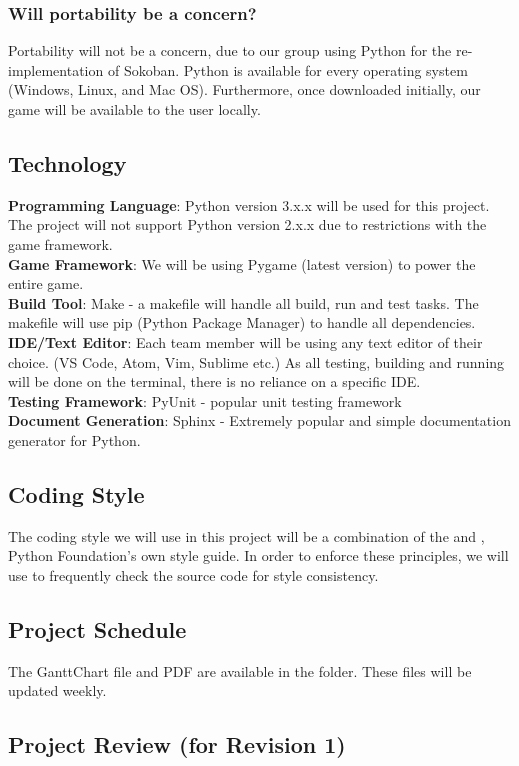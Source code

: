 \documentclass{article}
\begin{document}
\subsubsection{Will portability be a concern?}

Portability will not be a concern, due to our group using Python for the re-implementation of Sokoban. Python is available for every operating system (Windows, Linux, and Mac OS). Furthermore, once downloaded initially, our game will be available to the user locally.

\subsection{Technology}

\textbf{Programming Language}: Python version 3.x.x will be used for this project. The project will not support Python version 2.x.x due to restrictions with the game framework. 
\\[12pt]
\textbf{Game Framework}: We will be using Pygame (latest version) to power the entire game.
\\[12pt]
\textbf{Build Tool}: Make - a makefile will handle all build, run and test tasks. The makefile will use pip (Python Package Manager) to handle all dependencies.
\\[12pt]
\textbf{IDE/Text Editor}: Each team member will be using any text editor of their choice. (VS Code, Atom, Vim, Sublime etc.) As all testing, building and running will be done on the terminal, there is no reliance on a specific IDE.
\\[12pt]
\textbf{Testing Framework}: PyUnit - popular unit testing framework
\\[12pt]
\textbf{Document Generation}: Sphinx - Extremely popular and simple documentation generator for Python.


\subsection{Coding Style}
The coding style we will use in this project will be a combination of the
\href{https://developer.mozilla.org/en-US/docs/Mozilla/Developer_guide/Coding_Style#Python_Practices}{\color{blue}{Mozilla Python Coding Style}}
and 
\href{https://www.python.org/dev/peps/pep-0008/}{\color{blue}{PEP 8}},
Python Foundation's own style guide. In order to enforce these principles, we will use 
\href{https://www.pylint.org/}{\color{blue}{pylint}}
to frequently check the source code for style consistency. 

\subsection{Project Schedule}

The GanttChart file and PDF are available in the \href{https://gitlab.cas.mcmaster.ca/kalerg1/se3xa3/blob/master/Sokoban-Game/ProjectSchedule/}{\color{blue}{Project Schedule}} folder. These files will be updated weekly.

\subsection{Project Review (for Revision 1)}
\end{document}

